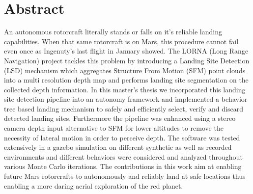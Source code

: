 \chapter*{Abstract}

An autonomous rotorcraft literally stands or falls on it's reliable landing capabilities. When that same rotorcraft is on Mars, this procedure cannot fail even once as Ingenuty's last flight in January showed. The LORNA (Long Range Navigation) project tackles this problem by introducing a Landing Site Detection (LSD) mechanism which aggregates Structure From Motion (SFM) point clouds into a multi resolution depth map and performs landing site segmentation on the collected depth information. In this master’s thesis we incorporated this landing site detection pipeline into an autonomy framework and implemented a behavior tree based landing mechanism to safely and efficiently select, verify and discard detected landing sites. Furthermore the pipeline was enhanced using a stereo camera depth input alternative to SFM for lower altitudes to remove the necessity of lateral motion in order to perceive depth. The software was tested extensively in a gazebo simulation on different synthetic as well as recorded environments and different behaviors were considered and analyzed throughout various Monte Carlo iterations. The contributions in this work aim at enabling future Mars rotorcrafts to autonomously and reliably land at safe locations thus enabling a more daring aerial exploration of the red planet.
